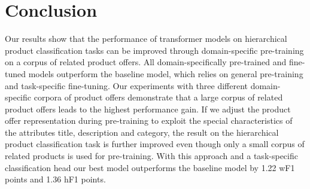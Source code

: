 \documentclass[11pt,dvipdfm]{article}
\begin{document}
\section{Conclusion}
\label{sec:conc}
Our results show that the performance of transformer models on hierarchical product classification tasks can be improved through domain-specific pre-training on a corpus of related product offers. 
All domain-specifically pre-trained and fine-tuned models outperform the baseline model, which relies on general pre-training and task-specific fine-tuning. 
Our experiments with three different domain-specific corpora of product offers demonstrate that a large corpus of related product offers leads to the highest performance gain.
If we adjust the product offer representation during pre-training to exploit the special characteristics of the attributes title, description and category, the result on the hierarchical product classification task is further improved even though only a small corpus of related products is used for pre-training.
With this approach and a task-specific classification head our best model outperforms the baseline model by 1.22 \ac{wF1} points and 1.36 \ac{hF1} points.
\end{document}
